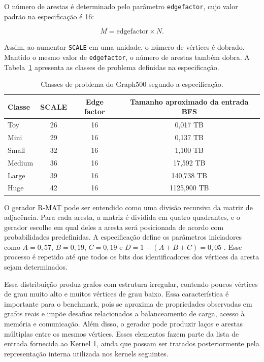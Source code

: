 O número de arestas é determinado pelo parâmetro \texttt{edgefactor}, cujo valor padrão na especificação é 16:

\begin{equation}
M = \mathrm{edgefactor} \times N.
\end{equation}

Assim, ao aumentar \texttt{SCALE} em uma unidade, o número de vértices é dobrado. Mantido o mesmo valor de \texttt{edgefactor}, o número de arestas também dobra. A Tabela~\ref{tab:graph500-classes} apresenta as classes de problema definidas na especificação.

\begin{table}[H]
\centering
\begin{tabular}{l|c|c|c}
Classe & SCALE & Edge factor & Tamanho aproximado da entrada BFS \\
\hline
Toy & 26 & 16 & 0,017 TB \\
Mini & 29 & 16 & 0,137 TB \\
Small & 32 & 16 & 1,100 TB \\
Medium & 36 & 16 & 17,592 TB \\
Large & 39 & 16 & 140,738 TB \\
Huge & 42 & 16 & 1125,900 TB \\
\end{tabular}
\caption{Classes de problema do Graph500 segundo a especificação.}
\label{tab:graph500-classes}
\end{table}

O gerador R-MAT pode ser entendido como uma divisão recursiva da matriz de adjacência. Para cada aresta, a matriz é dividida em quatro quadrantes, e o gerador escolhe em qual deles a aresta será posicionada de acordo com probabilidades predefinidas. A especificação define os parâmetros iniciadores como $A = 0{,}57$, $B = 0{,}19$, $C = 0{,}19$ e $D = 1 - (A+B+C) = 0{,}05$ \cite{graph500spec}. 
Esse processo é repetido até que todos os bits dos identificadores dos vértices da aresta sejam determinados.

Essa distribuição produz grafos com estrutura irregular, contendo poucos vértices de grau muito alto e muitos vértices de grau baixo. 
Essa característica é importante para o benchmark, pois se aproxima de propriedades observadas em grafos reais e impõe desafios relacionados a balanceamento de carga, acesso à memória e comunicação. Além disso, o gerador pode produzir laços e arestas múltiplas entre os mesmos vértices. Esses elementos fazem parte da lista de entrada fornecida ao Kernel 1, ainda que possam ser tratados posteriormente pela representação interna utilizada nos kernels seguintes.

